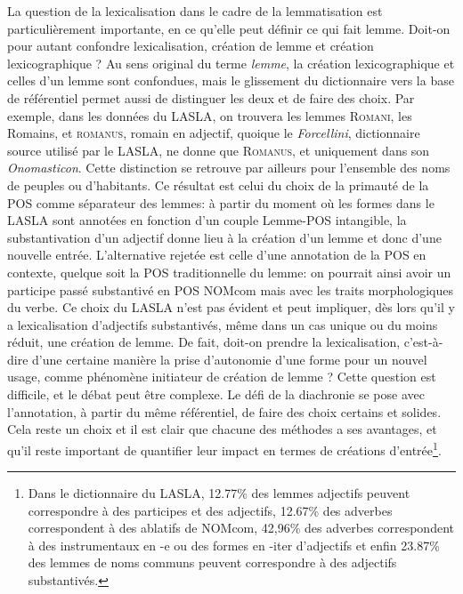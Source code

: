 La question de la lexicalisation dans le cadre de la lemmatisation est particulièrement importante, en ce qu'elle peut définir ce qui fait lemme. Doit-on pour autant confondre lexicalisation, création de lemme et création lexicographique ? Au sens original du terme \textit{lemme}, la création lexicographique et celles d'un lemme sont confondues, mais le glissement du dictionnaire vers la base de référentiel permet aussi de distinguer les deux et de faire des choix. Par exemple, dans les données du LASLA, on trouvera les lemmes \textsc{Romani}, les Romains, et \textsc{romanus}, romain en adjectif, quoique le \textit{Forcellini}, dictionnaire source utilisé par le LASLA, ne donne que \textsc{Romanus}, et uniquement dans son \textit{Onomasticon}. Cette distinction se retrouve par ailleurs pour l'ensemble des noms de peuples ou d'habitants. Ce résultat est celui du choix de la primauté de la POS comme séparateur des lemmes: à partir du moment où les formes dans le LASLA sont annotées en fonction d'un couple Lemme-POS intangible, la substantivation d'un adjectif donne lieu à la création d'un lemme et donc d'une nouvelle entrée. L'alternative rejetée est celle d'une annotation de la POS en contexte, quelque soit la POS traditionnelle du lemme: on pourrait ainsi avoir un participe passé substantivé en POS NOMcom mais avec les traits morphologiques du verbe. Ce choix du LASLA n'est pas évident et peut impliquer, dès lors qu'il y a lexicalisation d'adjectifs substantivés, même dans un cas unique ou du moins réduit, une création de lemme. De fait, doit-on prendre la lexicalisation, c'est-à-dire d'une certaine manière la prise d'autonomie d'une forme pour un nouvel usage, comme phénomène initiateur de création de lemme ? Cette question est difficile, et le débat peut être complexe. Le défi de la diachronie se pose avec l'annotation, à partir du même référentiel, de faire des choix certains et solides. Cela reste un choix et il est clair que chacune des méthodes a ses avantages, et qu'il reste important de quantifier leur impact en termes de créations d'entrée\footnote{Dans le dictionnaire du LASLA, 12.77\% des lemmes adjectifs peuvent correspondre à des participes et des adjectifs, 12.67\% des adverbes correspondent à des ablatifs de NOMcom, 42,96\% des adverbes correspondent à des instrumentaux en -e ou des formes en -iter d'adjectifs et enfin 23.87\% des lemmes de noms communs peuvent correspondre à des adjectifs substantivés.}.

